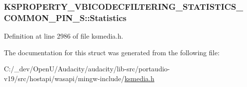 \subsubsection[{\texorpdfstring{Statistics}{Statistics}}]{ K\+S\+P\+R\+O\+P\+E\+R\+T\+Y\+\_\+\+V\+B\+I\+C\+O\+D\+E\+C\+F\+I\+L\+T\+E\+R\+I\+N\+G\+\_\+\+S\+T\+A\+T\+I\+S\+T\+I\+C\+S\+\_\+\+C\+O\+M\+M\+O\+N\+\_\+\+P\+I\+N\+\_\+\+S\+::\+Statistics}\hypertarget{struct_k_s_p_r_o_p_e_r_t_y___v_b_i_c_o_d_e_c_f_i_l_t_e_r_i_n_g___s_t_a_t_i_s_t_i_c_s___c_o_m_m_o_n___p_i_n___s_ab193df42c07fa81b56579f62035ebbfc}{}\label{struct_k_s_p_r_o_p_e_r_t_y___v_b_i_c_o_d_e_c_f_i_l_t_e_r_i_n_g___s_t_a_t_i_s_t_i_c_s___c_o_m_m_o_n___p_i_n___s_ab193df42c07fa81b56579f62035ebbfc}


Definition at line 2986 of file ksmedia.\+h.



The documentation for this struct was generated from the following file\+:\begin{DoxyCompactItemize}
\item 
C\+:/\+\_\+dev/\+Open\+U/\+Audacity/audacity/lib-\/src/portaudio-\/v19/src/hostapi/wasapi/mingw-\/include/\hyperlink{ksmedia_8h}{ksmedia.\+h}\end{DoxyCompactItemize}
